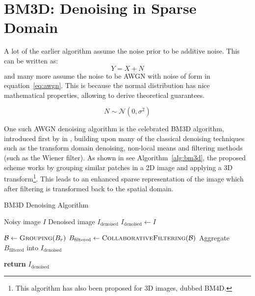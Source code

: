 \section{BM3D: Denoising in Sparse Domain}

A lot of the earlier algorithm assume the noise prior to be additive noise. This can be written as:
\begin{equation}
    Y = X + N
\end{equation}
and many more assume the noise to be \gls{AWGN} with noise of form in equation~\ref{eq:awgn}. This is because the normal distribution has nice mathematical properties, allowing to derive theoretical guarantees.

\begin{equation}\label{eq:awgn}
    N \sim \mathcal{N}(0, \sigma^2)
\end{equation}

One such \gls{AWGN} denoising algorithm is the celebrated \gls{BM3D} algorithm, introduced first by \citeauthor{dabovImageDenoisingSparse2007} in \cite{dabovImageDenoisingSparse2007}, building upon many of the classical denoising techniques such as the transform domain denoising, non-local means and filtering methods (such as the Wiener filter). As shown in see Algorithm~\ref{alg:bm3d}, the proposed scheme works by grouping similar patches in a 2D image and applying a 3D transform\footnote{This algorithm has also been proposed for 3D images, dubbed BM4D.}. This leads to an enhanced sparse representation of the image which after filtering is transformed back to the spatial domain.
\begin{algorithm}
    \caption{BM3D Denoising Algorithm}\label{alg:bm3d}
    \begin{algorithmic}[1]
    \Require Noisy image $I$
    \Ensure Denoised image $I_{\text{denoised}}$
    \Statex
        \State $I_{\text{denoised}} \gets I$
        
            \State $\mathcal{B} \gets \textsc{Grouping}(B_r)$
            \State $B_{\text{filtered}} \gets \textsc{CollaborativeFiltering}(\mathcal{B})$
            \State Aggregate $B_{\text{filtered}}$ into $I_{\text{denoised}}$
        \EndFor
        
        \State \textbf{return} $I_{\text{denoised}}$
    \EndProcedure
    \end{algorithmic}
\end{algorithm}

